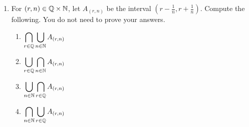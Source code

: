 \begin{enumerate}
    \item For $(r, n) \in \mathbb{Q} \times \mathbb{N}$, let $A_{(r,n)}$ be the interval $(r - \frac{1}{n}, r + \frac{1}{n})$. Compute the following. You do not need to prove your answers.
  \begin{enumerate}
      \item $\displaystyle\bigcap_{r \in \mathbb{Q}} \bigcup_{n \in \mathbb{N}} A_{(r,n)}$
      \item $\displaystyle\bigcup_{r \in \mathbb{Q}} \bigcap_{n \in \mathbb{N}} A_{(r,n)}$
      \item $\displaystyle\bigcup_{n \in \mathbb{N}} \bigcap_{r \in \mathbb{Q}} A_{(r,n)}$
      \item $\displaystyle\bigcap_{n \in \mathbb{N}} \bigcup_{r \in \mathbb{Q}} A_{(r,n)}$
  \end{enumerate}

\end{enumerate}
